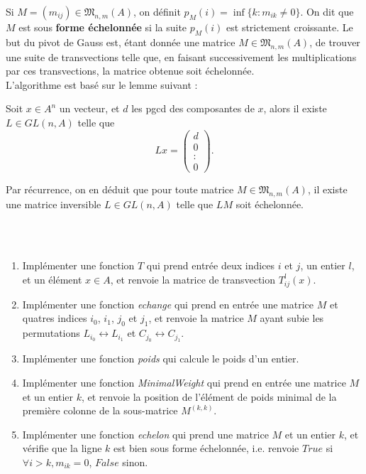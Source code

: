 Si $M=(m_{ij})\in \mathfrak M_{n,m}(A)$, on définit $p_M(i)=\inf\{k : m_{ik}\neq 0\}$. On dit que $M$ est sous \textbf{forme échelonnée} si la suite $p_M(i)$ est strictement croissante. Le but du pivot de Gauss est, étant donnée une matrice $M\in \mathfrak M_{n,m}(A)$, de trouver une suite de transvections telle que, en faisant successivement les multiplications par ces transvections, la matrice obtenue soit échelonnée.\\

L'algorithme est basé sur le lemme suivant :
\begin{lem}
Soit $x\in A^n$ un vecteur, et $d$ les pgcd des composantes de $x$, alors il existe $L\in GL(n,A)$ telle que 
\[Lx=\begin{pmatrix}d \\ 0\\ :\\ 0\end{pmatrix}.\]
\end{lem}

Par récurrence, on en déduit que pour toute matrice $M\in\mathfrak M_{n,m}(A)$, il existe une matrice inversible $L\in GL(n,A)$ telle que $LM$ soit échelonnée.

\\
\\


\begin{enumerate}
\item Implémenter une fonction $T$ qui prend entrée deux indices $i$ et $j$, un entier $l$, et un élément $x\in A$, et renvoie la matrice de transvection $T_{ij}^l(x)$.
\item Implémenter une fonction \textit{echange} qui prend en entrée une matrice $M$ et quatres indices $i_0$, $i_1$, $j_0$ et $j_1$, et renvoie la matrice $M$ ayant subie les permutations $L_{i_0}\leftrightarrow L_{i_1}$ et $C_{j_0}\leftrightarrow C_{j_1}$.
\item Implémenter une fonction \textit{poids} qui calcule le poids d'un entier.
\item Implémenter une fonction \textit{MinimalWeight} qui prend en entrée une matrice $M$ et un entier $k$, et renvoie la position de l'élément de poids minimal de la première colonne de la sous-matrice $M^{(k,k)}$.
\item Implémenter une fonction \textit{echelon} qui prend une matrice $M$ et un entier $k$, et vérifie que la ligne $k$ est bien sous forme échelonnée, i.e. renvoie $True$ si $\forall i>k, m_{ik}=0 $, $False$ sinon. 
\end{enumerate}

